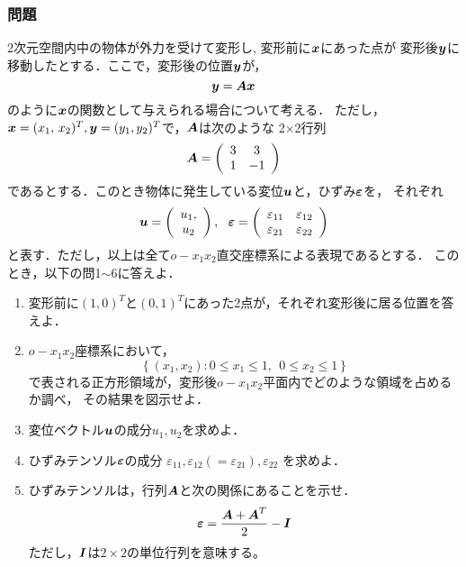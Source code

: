 \documentclass[10pt,a4j]{jarticle}
\begin{document}
\subsubsection*{問題}
2次元空間内中の物体が外力を受けて変形し, 変形前に$\mbox{\boldmath $x$}$にあった点が
変形後$\mbox{\boldmath $y$}$に移動したとする．ここで，変形後の位置$\mbox{\boldmath $y$}$が，
\begin{equation}
	\mbox{\boldmath $y$}=\mbox{\boldmath $A$}\mbox{\boldmath $x$}
	\label{eqn:disp_fld}
\end{equation}
のように$\mbox{\boldmath $x$}$の関数として与えられる場合について考える．
ただし，$\mbox{\boldmath $x$}=(x_1,\, x_2)^T, \mbox{\boldmath $y$}=(y_1, y_2)^T$で，$\mbox{\boldmath $A$}$は次のような
2$\times$2行列
\begin{equation}
	\mbox{\boldmath $A$}=
	\left(
	\begin{array}{cc}
		 3 & 3 \\
	 	 1 & -1 
	\end{array}
	\label{eqn:Amat}
	\right)
\end{equation}
であるとする．このとき物体に発生している変位$\mbox{\boldmath $u$}$と，ひずみ$\mbox{\boldmath $\varepsilon$}$を，
それぞれ
\begin{equation}
	\fat{u}=\left( 
	\begin{array}{c}
	u_1,\\
	u_2 
	\end{array}
	\right)
	, \ \ 
	\fat{\varepsilon}
	=
	\left(
	\begin{array}{cc}
		\varepsilon_{11} & \varepsilon_{12} \\
		\varepsilon_{21} & \varepsilon_{22} 
	\end{array}
	\right)
\end{equation}
と表す．ただし，以上は全て$o-x_1x_2$直交座標系による表現であるとする．
このとき，以下の問1$\sim$6に答えよ．
\begin{enumerate}
\item
	変形前に$(1,0)^T$と$(0,1)^T$にあった2点が，それぞれ変形後に居る位置を答えよ．
\item
	$o-x_1x_2$座標系において，
	\[
		\left\{ (x_1,x_2):
		0\leq x_1 \leq 1, 
		\ \
		0\leq x_2 \leq 1
		\right\}
	\]
	で表される正方形領域が，変形後$o-x_1x_2$平面内でどのような領域を占めるか調べ，
	その結果を図示せよ．
\item
	変位ベクトル$\mbox{\boldmath $u$}$の成分$u_1,u_2$を求めよ．
\item
	ひずみテンソル$\mbox{\boldmath $\varepsilon$}$の成分
	$\varepsilon_{11},\varepsilon_{12}(=\varepsilon_{21}), \varepsilon_{22}$
	を求めよ．
\item
	ひずみテンソルは，行列$\mbox{\boldmath $A$}$と次の関係にあることを示せ．
	\[
		\mbox{\boldmath $\varepsilon$}=\frac{\mbox{\boldmath $A$}+\mbox{\boldmath $A$}^T}{2}-\mbox{\boldmath $I$}
	\]
	ただし，$\mbox{\boldmath $I$}$は$2\times 2$の単位行列を意味する。
\end{enumerate}
\end{document}
